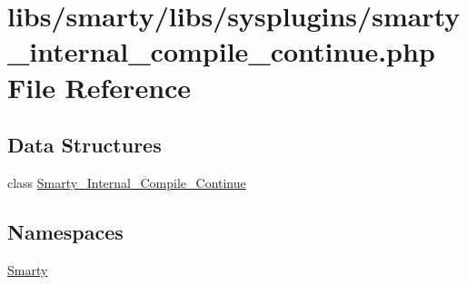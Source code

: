 \hypertarget{smarty__internal__compile__continue_8php}{}\section{libs/smarty/libs/sysplugins/smarty\+\_\+internal\+\_\+compile\+\_\+continue.php File Reference}
\label{smarty__internal__compile__continue_8php}
\subsection*{Data Structures}
\begin{DoxyCompactItemize}
\item 
class \hyperlink{class_smarty___internal___compile___continue}{Smarty\+\_\+\+Internal\+\_\+\+Compile\+\_\+\+Continue}
\end{DoxyCompactItemize}
\subsection*{Namespaces}
\begin{DoxyCompactItemize}
\item 
 \hyperlink{namespace_smarty}{Smarty}
\end{DoxyCompactItemize}
